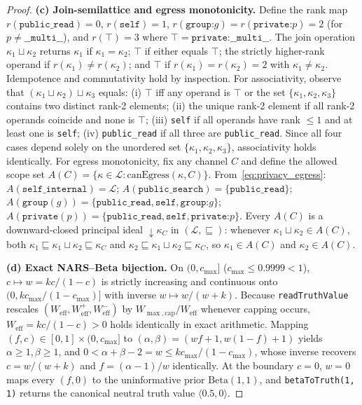 \begin{proof}
\textbf{(c) Join-semilattice and egress monotonicity.}
Define the rank map $r(\texttt{public\_read}) = 0$, $r(\texttt{self}) = 1$, $r(\texttt{group:}g) = r(\texttt{private:}p) = 2$ (for $p \neq \texttt{\_\_multi\_\_}$), and $r(\top) = 3$ where $\top = \texttt{private:\_\_multi\_\_}$. The join operation $\kappa_1 \sqcup \kappa_2$ returns $\kappa_1$ if $\kappa_1 = \kappa_2$; $\top$ if either equals $\top$; the strictly higher-rank operand if $r(\kappa_1) \neq r(\kappa_2)$; and $\top$ if $r(\kappa_1) = r(\kappa_2) = 2$ with $\kappa_1 \neq \kappa_2$. Idempotence and commutativity hold by inspection. For associativity, observe that $(\kappa_1 \sqcup \kappa_2) \sqcup \kappa_3$ equals: (i) $\top$ iff any operand is $\top$ or the set $\{\kappa_1,\kappa_2,\kappa_3\}$ contains two distinct rank-2 elements; (ii) the unique rank-2 element if all rank-2 operands coincide and none is $\top$; (iii) \texttt{self} if all operands have rank $\le 1$ and at least one is \texttt{self}; (iv) \texttt{public\_read} if all three are \texttt{public\_read}. Since all four cases depend solely on the unordered set $\{\kappa_1, \kappa_2, \kappa_3\}$, associativity holds identically.
For egress monotonicity, fix any channel $C$ and define the allowed scope set $A(C) = \{\kappa \in \mathcal{L} : \mathrm{canEgress}(\kappa, C)\}$. From~\eqref{eq:privacy_egress}:
$A(\texttt{self\_internal}) = \mathcal{L}$;
$A(\texttt{public\_search}) = \{\texttt{public\_read}\}$;
$A(\texttt{group}(g)) = \{\texttt{public\_read}, \texttt{self}, \texttt{group:}g\}$;
$A(\texttt{private}(p)) = \{\texttt{public\_read}, \texttt{self}, \texttt{private:}p\}$.
Every $A(C)$ is a downward-closed principal ideal $\downarrow\!\kappa_C$ in $(\mathcal{L}, \sqsubseteq)$: whenever $\kappa_1 \sqcup \kappa_2 \in A(C)$, both $\kappa_1 \sqsubseteq \kappa_1 \sqcup \kappa_2 \sqsubseteq \kappa_C$ and $\kappa_2 \sqsubseteq \kappa_1 \sqcup \kappa_2 \sqsubseteq \kappa_C$, so $\kappa_1 \in A(C)$ and $\kappa_2 \in A(C)$.

\textbf{(d) Exact NARS--Beta bijection.}
On $(0, c_{\max}]$ ($c_{\max} \le 0.9999 < 1$), $c \mapsto w = k c / (1 - c)$ is strictly increasing and continuous onto $(0, k c_{\max}/(1 - c_{\max})]$ with inverse $w \mapsto w / (w + k)$. Because \texttt{readTruthValue} rescales $(W_{\mathrm{eff}}, W_{\mathrm{eff}}^+, W_{\mathrm{eff}}^-)$ by $W_{\max,\mathrm{cap}}/W_{\mathrm{eff}}$ whenever capping occurs, $W_{\mathrm{eff}} = k c / (1 - c) > 0$ holds identically in exact arithmetic. Mapping $(f, c) \in [0, 1] \times (0, c_{\max}]$ to $(\alpha, \beta) = (w f + 1, w(1 - f) + 1)$ yields $\alpha \ge 1, \beta \ge 1$, and $0 < \alpha + \beta - 2 = w \le k c_{\max}/(1 - c_{\max})$, whose inverse recovers $c = w / (w + k)$ and $f = (\alpha - 1)/w$ identically. At the boundary $c = 0$, $w = 0$ maps every $(f, 0)$ to the uninformative prior $\mathrm{Beta}(1, 1)$, and \texttt{betaToTruth(1, 1)} returns the canonical neutral truth value $\langle 0.5, 0 \rangle$.
\end{proof}

